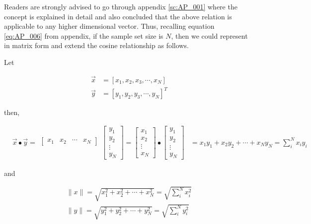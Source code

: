 \documentclass[tikz = true, float=false, crop=false, 11pt]{standalone}
\begin{document}
	Readers are strongly advised to go through appendix \ref{sc:AP_001} where the concept is explained in detail and also concluded that the above relation is applicable to any higher dimensional vector. Thus, recalling equation \ref{eq:AP_006} from appendix, if the sample set size is $N$, then we could represent in matrix form and extend the cosine relationship as follows. 
	
	Let 
	
	$$\begin{aligned}
	\vec{x} &= [x_1, x_2, x_3, \cdots, x_N] \\
	\vec{y} &= [y_1, y_2, y_3, \cdots, y_N]^T
	\end{aligned}$$
	
	then, 
	
	$$\begin{aligned}
	& \vec{x} \bullet \vec{y} = 
	\begin{matrix}
	\begin{bmatrix}
	x_1 & x_2 & \cdots & x_N
	\end{bmatrix}     \\[10ex] 
	\end{matrix}
	\begin{bmatrix} 
	y_1 \\ y_2 \\ \vdots \\ y_N
	\end{bmatrix} = 
	\begin{bmatrix} 
	x_1 \\ x_2 \\ \vdots \\ x_N
	\end{bmatrix} \bullet
	\begin{bmatrix} 
	y_1 \\ y_2 \\ \vdots \\ y_N
	\end{bmatrix}	
	&= x_1y_1 + x_2y_2 + \cdots + x_N y_N = \sum_i^N x_i y_i
	\end{aligned}$$
	
	and 
	
	$$\begin{aligned}
	\lVert x \rVert = \sqrt{x_1^2 + x_2^2 + \cdots + x_N^2} = \sqrt{\sum_i^N x_i^2} \\
	\lVert y \rVert = \sqrt{y_1^2 + y_2^2 + \cdots + y_N^2} = \sqrt{\sum_i^N y_i^2} \\
	\end{aligned}$$
	
\end{document}
